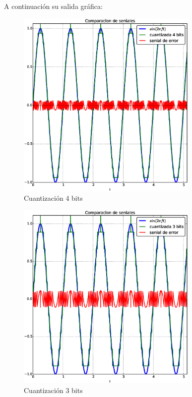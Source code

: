 \documentclass[10pt]{article}
\begin{document}
A continuación su salida gráfica:


\begin{figure}[H]
   \centering
   \includegraphics[width=0.78\textwidth]{./Images/seniales_4_bits.eps}
   \caption{Cuantización 4 bits}\label{fig:q:4}     
\end{figure}


\begin{figure}[H]
   \centering
   \includegraphics[width=0.78\textwidth]{./Images/seniales_3_bits.eps}
   \caption{Cuantización 3 bits}\label{fig:q:3}     
\end{figure}
\end{document}
